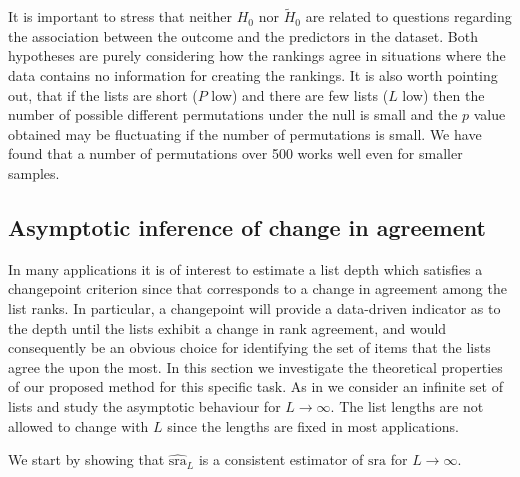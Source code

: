 \documentclass[oupdraft]{bio}
\newcommand{\added}[1]{{\color{added}{}#1}}
\DeclareMathOperator{\E}{\mathbb{E}}
\begin{document}
\added{It is important to stress that neither $H_0$ nor
  $\widetilde H_0$ are related to questions regarding the association
  between the outcome and the predictors in the dataset. Both
  hypotheses are purely considering how the rankings agree in
  situations where the data contains no information for creating the
  rankings. It is also worth pointing out, that if the lists are short
  ($P$ low) and there are few lists ($L$ low) then the number of
  possible different permutations under the null is small and the $p$
  value obtained may be fluctuating if the number of permutations is
  small. We have found that a number of permutations over 500 works
  well even for smaller samples.}


\subsection{Asymptotic inference of change in agreement}\label{sec:chgpoint}
In many applications it is of interest to estimate a list depth which
satisfies a changepoint criterion since that corresponds to a change
in agreement among the list ranks. \added{In particular, a changepoint
  will provide a data-driven indicator as to the depth until the lists
  exhibit a change in rank agreement, and would consequently be an
  obvious choice for identifying the set of items that the lists agree
  the upon the most}. In this section we investigate the theoretical
properties of our proposed method for this specific task. As in
\citet{hall:schi:2012} we consider an infinite set of lists and study
the asymptotic behaviour for $L\to\infty$. The list lengths are not
allowed to change with $L$ since the lengths are fixed in most
applications.

We start by showing that $\widehat{\textrm{sra}}_L$ is a consistent
estimator of $\textrm{sra}$ for $L \rightarrow \infty$.

\end{document}
